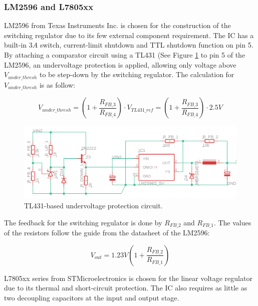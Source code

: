 \documentclass[../main.tex]{subfiles}
\begin{document}
    \pagebreak
    \subsubsection{LM2596 and L7805xx}

    \justify
    LM2596 from Texas Instruments Inc. \cite{LM2596} is chosen for the construction of the switching regulator due to its few external component requirement. The IC has a built-in $3A$ switch, current-limit shutdown and TTL shutdown function on pin 5. By attaching a comparator circuit using a TL431 \cite{TL431} (See Figure \ref{fig:undervoltage_protection} to pin 5 of the LM2596, an undervoltage protection is applied, allowing only voltage above $V_{under\_thresh}$ to be step-down by the switching regulator. The calculation for $V_{under\_thresh}$ is as follow:

    \begin{equation}
        V_{under\_thresh} = (1+\dfrac{R_{FB\_3}}{R_{FB\_4}})\cdot V_{TL431\_ref} = (1+\dfrac{R_{FB\_3}}{R_{FB\_4}})\cdot 2.5V
    \end{equation}

    \begin{figure}[!h]
        \centerline{\includegraphics[width=\linewidth]{media/undervoltage_protection.png}}
        \caption{TL431-based undervoltage protection circuit.}
        \label{fig:undervoltage_protection}
    \end{figure}

    \justify
    The feedback for the switching regulator is done by $R_{FB\_2}$ and $R_{FB\_1}$. The values of the resistors follow the guide from the datasheet of the LM2596:

    \begin{equation}
        V_{out} = 1.23V(1 + \dfrac{R_{FB\_2}}{R_{FB\_1}})
    \end{equation}

    \justify
    L7805xx series from STMicroelectronics \cite{L78} is chosen for the linear voltage regulator due to its thermal and short-circuit protection. The IC also requires as little as two decoupling capacitors at the input and output stage.
    
\end{document}
